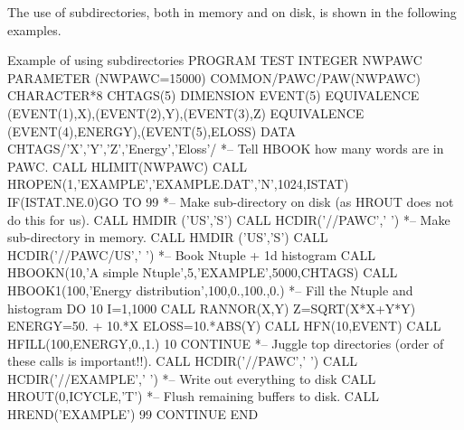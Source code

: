 The use of subdirectories, both in memory and on disk, is
shown in the following examples.

\begin{XMPt}{Example of using subdirectories}
      PROGRAM TEST
      INTEGER    NWPAWC
      PARAMETER (NWPAWC=15000)
      COMMON/PAWC/PAW(NWPAWC)
      CHARACTER*8 CHTAGS(5)
      DIMENSION EVENT(5)
      EQUIVALENCE (EVENT(1),X),(EVENT(2),Y),(EVENT(3),Z)
      EQUIVALENCE (EVENT(4),ENERGY),(EVENT(5),ELOSS)
      DATA CHTAGS/'X','Y','Z','Energy','Eloss'/
*-- Tell HBOOK how many words are in PAWC.
      CALL HLIMIT(NWPAWC)
      CALL HROPEN(1,'EXAMPLE','EXAMPLE.DAT','N',1024,ISTAT)
      IF(ISTAT.NE.0)GO TO 99
*-- Make sub-directory on disk (as HROUT does not do this for us).
      CALL HMDIR ('US','S')
      CALL HCDIR('//PAWC',' ')
*-- Make sub-directory in memory.
      CALL HMDIR ('US','S')
      CALL HCDIR('//PAWC/US',' ')
*-- Book Ntuple + 1d histogram
      CALL HBOOKN(10,'A simple Ntuple',5,'EXAMPLE',5000,CHTAGS)
      CALL HBOOK1(100,'Energy distribution',100,0.,100.,0.)
*-- Fill the Ntuple and histogram
      DO 10 I=1,1000
         CALL RANNOR(X,Y)
         Z=SQRT(X*X+Y*Y)
         ENERGY=50. + 10.*X
         ELOSS=10.*ABS(Y)
         CALL HFN(10,EVENT)
         CALL HFILL(100,ENERGY,0.,1.)
 10   CONTINUE
*-- Juggle top directories (order of these calls is important!!).
      CALL HCDIR('//PAWC',' ')
      CALL HCDIR('//EXAMPLE',' ')
*-- Write out everything to disk
      CALL HROUT(0,ICYCLE,'T')
*-- Flush remaining buffers to disk.
      CALL HREND('EXAMPLE')
 99   CONTINUE
      END
\end{XMPt}

\endinput



